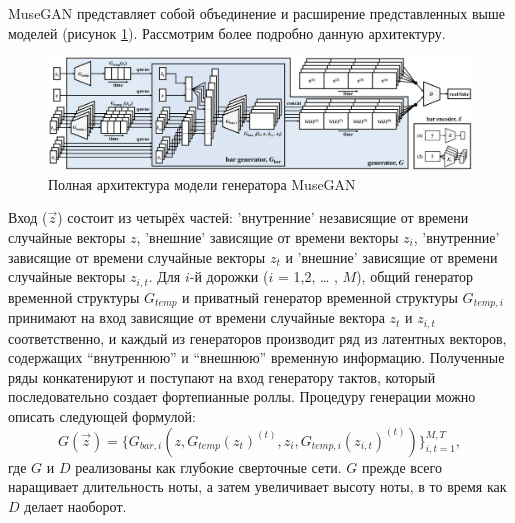     MuseGAN представляет собой объединение и расширение представленных выше моделей (рисунок \ref{fig:full_musegan}). Рассмотрим более подробно данную архитектуру. 
    
    \begin{figure}[h]
        \centering
        \includegraphics[scale=0.38]{tex/png/full_musegan.png}
        \caption{Полная архитектура модели генератора MuseGAN \cite{musegan}}
        \label{fig:full_musegan}
    \end{figure}
    
    Вход ($\vec{z}$) состоит из четырёх частей: 'внутренние'  независящие от времени случайные векторы $z$, 'внешние'  зависящие от времени векторы $z_i$, 'внутренние'  зависящие от времени случайные векторы $z_t$ и 'внешние'  зависящие от времени случайные векторы ${z_{i,t}}$. Для $i$-й дорожки ($i$ = 1,2, … , $M$), общий генератор временной структуры $G_{temp}$ и приватный генератор временной структуры $G_{temp, i}$ принимают на вход зависящие от времени случайные вектора $z_{t}$ и $z_{i,t}$ соответственно, и каждый из генераторов производит ряд из латентных векторов, содержащих “внутреннюю” и “внешнюю” временную информацию. Полученные ряды конкатенируют и поступают на вход генератору тактов, который последовательно создает фортепианные роллы. Процедуру генерации можно описать следующей формулой:
    $$G(\vec{z}) = \{G_{bar,i} (z, G_{temp}(z_{t})^{(t)}, z_{i}, G_{temp,i}(z_{i,t})^{(t)}) \} ^ {M,T} _ {i,t=1},$$
    где $G$ и $D$ реализованы как глубокие сверточные сети. $G$ прежде всего наращивает длительность ноты, а затем увеличивает высоту ноты, в то время как $D$ делает наоборот.
    
